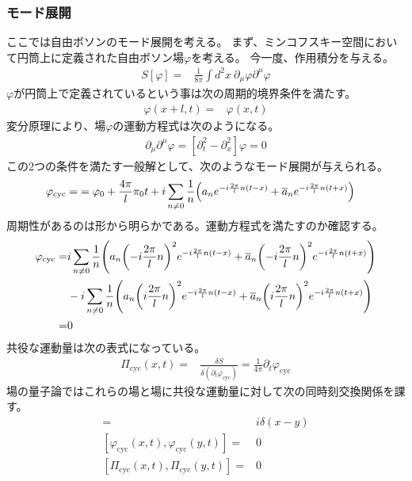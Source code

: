 \documentclass[11pt, dvipdfmx]{article}
\numberwithin{equation}{section}
\begin{document}
\subsubsection{モード展開}
ここでは自由ボソンのモード展開を考える。
まず、ミンコフスキー空間において円筒上に定義された自由ボソン場$\varphi$を考える。
今一度、作用積分を与える。
\begin{align*}
    S[\varphi]=&\frac{1}{8\pi}\int d^2x \ \partial_{\mu}\varphi \partial^{\mu}\varphi
\end{align*}
$\varphi$が円筒上で定義されているという事は次の周期的境界条件を満たす。
\begin{align}
    \varphi(x+l,t)=&\varphi(x,t)
\end{align}
変分原理により、場$\varphi$の運動方程式は次のようになる。
\begin{align}
    \partial_{\mu}\partial^{\mu}\varphi=[\partial_t^2 - \partial_x^2]\varphi=0
\end{align}
この2つの条件を満たす一般解として、次のようなモード展開が与えられる。
\begin{align}
    \varphi_{\text{cyc}}=&=\varphi_0+\frac{4\pi}{l}\pi_0 t+i\sum_{n\neq 0}\frac{1}{n}\qty(a_n e^{-i\frac{2\pi}{l}n(t-x)} + \overline{a}_n e^{-i\frac{2\pi}{l}n(t+x)})
\end{align}
周期性があるのは形から明らかである。運動方程式を満たすのか確認する。
\begin{align}
    [\partial_t^2 - \partial_x^2]\varphi_{\text{cyc}}=&i\sum_{n\neq 0}\frac{1}{n}\qty(a_n \qty(-i\frac{2\pi}{l}n)^2 e^{-i\frac{2\pi}{l}n(t-x)} + \overline{a}_n \qty(-i\frac{2\pi}{l}n)^2 e^{-i\frac{2\pi}{l}n(t+x)} )\nonumber\\
    &-i\sum_{n\neq 0}\frac{1}{n}\qty(a_n \qty(i\frac{2\pi}{l}n)^2 e^{-i\frac{2\pi}{l}n(t-x)} + \overline{a}_n \qty(i\frac{2\pi}{l}n)^2 e^{-i\frac{2\pi}{l}n(t+x)} )\nonumber\\
    =&0
\end{align}
共役な運動量は次の表式になっている。
\begin{align}
    \Pi_{\text{cyc}}(x,t)=&\frac{\delta S}{\delta (\partial_t \varphi_{\text{cyc}})}=\frac{1}{4\pi}\partial_t \varphi_{\text{cyc}}
\end{align}
場の量子論ではこれらの場と場に共役な運動量に対して次の同時刻交換関係を課す。
\begin{align}
    [\varphi_{\text{cyc}}(x,t),\Pi_{\text{cyc}}(y,t)]=&i\delta(x-y)\label{commutation relation} \\
    [\varphi_{\text{cyc}}(x,t),\varphi_{\text{cyc}}(y,t)]=&0\label{commutation relation 2}\\
    [\Pi_{\text{cyc}}(x,t),\Pi_{\text{cyc}}(y,t)]=&0\label{commutation relation 3}
\end{align}
\end{document}
